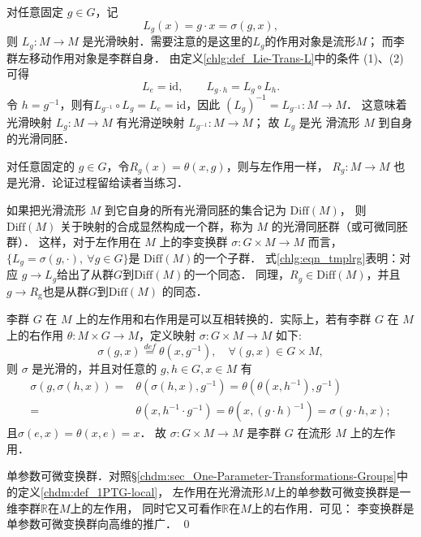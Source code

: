 对任意固定 $g \in G$，记
\begin{equation}
    L_g(x)=g \cdot x=\sigma( g,x),
\end{equation}
则 $L_g: M \rightarrow M$ 是光滑映射．需要注意的是这里的$L_g$的作用对象是流形$M$；
而李群左移动作用对象是李群自身．
由定义\ref{chlg:def_Lie-Trans-L}中的条件 (1)、(2) 可得
\begin{equation}\label{chlg:eqn_tmplrg}
    L_e  =\mathrm{id}, \qquad
    L_{g \cdot h}  =L_g \circ L_h .
\end{equation}
令 $h=g^{-1}$，则有$L_{g^{-1}} \circ L_{g}=L_{e}=\mathrm{id} $，因此
$(L_{g})^{-1}=L_{g^{-1}}: M \to M $．
这意味着光滑映射 $L_{g}: M \to M$ 有光滑逆映射 $L_{g^{-1}}: M \to M$； 
故 $L_{g}$ 是光 滑流形 $M$ 到自身的光滑{\heiti 同胚}．

对任意固定的 $g \in G$，令$R_g(x)=\theta(x,g)$，则与左作用一样，
$R_g: M \to M$ 也是光滑．论证过程留给读者当练习．

如果把光滑流形 $M$ 到它自身的所有光滑同胚的集合记为 $\mathrm{Diff}(M)$，
则 $\mathrm{Diff}(M)$ 关于映射的合成显然构成一个群，称为 $M$ 的光滑{\heiti 同胚群}（或可微同胚群）．
这样，对于左作用在 $M$ 上的李变换群 $\sigma: G \times M \to M$ 而言，
$\{L_g=\sigma(g,\cdot),\ \forall g \in G\}$是 $\mathrm{Diff}(M)$的一个子群．
式\eqref{chlg:eqn_tmplrg}表明：对应 $g \to L_{g}$给出了从群$G$到$\mathrm{Diff}(M)$的一个同态．
同理，$R_g \in \mathrm{Diff}(M)$，并且 $g \to R_{\mathrm{g}}$也是从群$G$到$\mathrm{Diff}(M)$ 的同态．




李群 $G$ 在 $M$ 上的左作用和右作用是可以互相转换的．实际上，若有李群 $G$ 在 $M$ 
上的右作用 $\theta: M \times G \to M$，定义映射 $\sigma: G \times M \to M$ 如下:
\begin{equation}
    \sigma(g, x)\overset{def}{=} \theta(x, g^{-1}), \quad \forall(g, x) \in G \times M,
\end{equation}
则 $\sigma$ 是光滑的，并且对任意的 $g, h \in G, x \in M$ 有
\begin{align*}
    \sigma(g, \sigma(h, x))=&\theta\left(\sigma(h, x), g^{-1}\right) 
    =  \theta\left(\theta\left(x, h^{-1}\right), g^{-1}\right) \\
    =& \theta\left(x, h^{-1} \cdot g^{-1}\right) 
    = \theta\left(x,(g \cdot h)^{-1}\right)=\sigma(g \cdot h, x) ;
\end{align*}
且$\sigma(e, x)=\theta(x, e)=x$．
故 $\sigma: G \times M \rightarrow M$ 是李群 $G$ 在流形 $M$ 上的左作用．


\begin{example}
    单参数可微变换群．对照\S\ref{chdm:sec_One-Parameter-Transformations-Groups}中的定义\ref{chdm:def_1PTG-local}，
    左作用在光滑流形$M$上的单参数可微变换群是一维李群$\mathbb{R}$在$M$上的左作用，
    同时它又可看作$\mathbb{R}$在$M$上的右作用．可见：
    李变换群是单参数可微变换群向高维的推广． \qed
\end{example}

